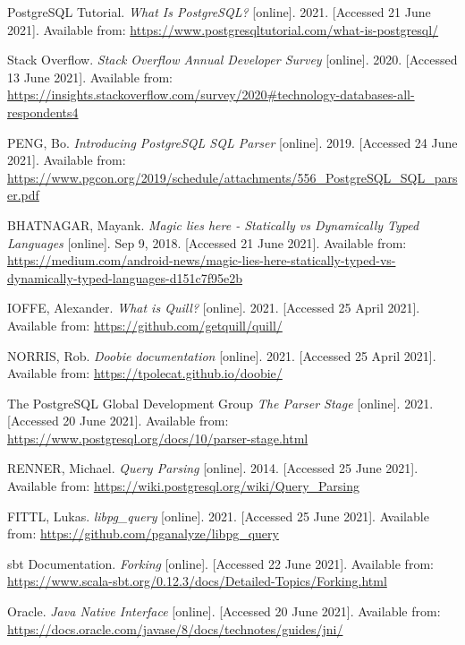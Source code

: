 \documentclass[thesis=B,english]{FITthesis}[2019/12/23]
\begin{document}


\begin{thebibliography}{9}

PostgreSQL Tutorial.
\textit {What Is PostgreSQL?} [online]. 2021. [Accessed 21 June 2021]. Available from:
\url{https://www.postgresqltutorial.com/what-is-postgresql/}

Stack Overflow.
\textit {Stack Overflow Annual Developer Survey} [online]. 2020. [Accessed 13 June 2021].
Available from: \url{https://insights.stackoverflow.com/survey/2020\#technology-databases-all-respondents4}

PENG, Bo.
\textit {Introducing PostgreSQL SQL Parser} [online]. 2019. [Accessed 24 June 2021]. Available from:
\url{https://www.pgcon.org/2019/schedule/attachments/556\_PostgreSQL\_SQL\_parser.pdf}

BHATNAGAR, Mayank.
\textit {Magic lies here - Statically vs Dynamically Typed Languages} [online]. Sep 9, 2018. [Accessed 21 June 2021]. Available from: \url{https://medium.com/android-news/magic-lies-here-statically-typed-vs-dynamically-typed-languages-d151c7f95e2b}

IOFFE, Alexander.
\textit {What is Quill?} [online]. 2021. [Accessed 25 April 2021]. Available from: \url{https://github.com/getquill/quill/}

NORRIS, Rob. 
\textit {Doobie documentation} [online]. 2021. [Accessed 25 April 2021]. Available from: \url{https://tpolecat.github.io/doobie/}

The PostgreSQL Global Development Group
\textit{The Parser Stage} [online]. 2021. [Accessed 20 June 2021]. Available from: \url{https://www.postgresql.org/docs/10/parser-stage.html}

RENNER, Michael.
\textit {Query Parsing} [online]. 2014. [Accessed 25 June 2021]. Available from:
\url{https://wiki.postgresql.org/wiki/Query\_Parsing}

FITTL, Lukas.
\textit {libpg\_query} [online]. 2021. [Accessed 25 June 2021]. Available from:
\url{https://github.com/pganalyze/libpg\_query}

sbt Documentation.
\textit {Forking} [online]. [Accessed 22 June 2021]. Available from:
\url{https://www.scala-sbt.org/0.12.3/docs/Detailed-Topics/Forking.html}

Oracle.
\textit{Java Native Interface} [online]. [Accessed 20 June 2021]. Available from:
\url{https://docs.oracle.com/javase/8/docs/technotes/guides/jni/}


\end{thebibliography}
\end{document}
